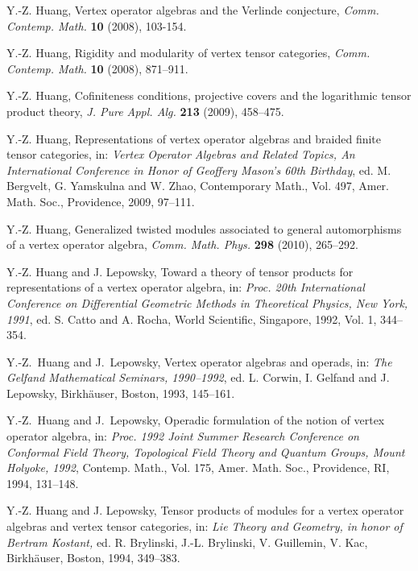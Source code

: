 \documentclass[12pt]{article}
\begin{document}
\begin{thebibliography}{FGST2}
 Y.-Z. Huang, Vertex operator
algebras and the Verlinde conjecture, {\em Comm. Contemp. Math.}
{\bf 10} (2008), 103-154. 

 Y.-Z. Huang, Rigidity and modularity of vertex
tensor categories, {\em Comm. Contemp. Math.} {\bf 10} (2008), 871--911. 


 Y.-Z. Huang, Cofiniteness conditions, projective
covers and the logarithmic tensor product theory, {\em J. Pure
Appl. Alg.} {\bf 213} (2009), 458--475.

Y.-Z. Huang, Representations of vertex operator algebras and braided 
finite tensor categories, in: {\it Vertex Operator Algebras and Related 
Topics, An International Conference in Honor of Geoffery Mason's 60th Birthday}, 
ed. M. Bergvelt, G. Yamskulna and W. Zhao, Contemporary Math., Vol. 497, 
Amer. Math. Soc., Providence, 2009, 97--111. 

Y.-Z. Huang, Generalized twisted modules associated to 
general automorphisms of a vertex operator algebra, 
{\it Comm. Math. Phys.} {\bf 298} (2010), 265--292. 

Y.-Z. Huang and J. Lepowsky, Toward a
theory of tensor products for representations of a vertex operator
algebra, in: {\em Proc. 20th International Conference on Differential
Geometric Methods in Theoretical Physics, New York, 1991},
ed. S. Catto and A. Rocha, World Scientific, Singapore, 1992, Vol. 1,
344--354.

Y.-Z.~Huang and J.~Lepowsky,
Vertex operator algebras and operads,
in: {\em The Gelfand Mathematical Seminars, 1990--1992},
ed. L. Corwin, I. Gelfand and J. Lepowsky, Birkh\"{a}user, Boston,
1993, 145--161.

Y.-Z.~Huang and J.~Lepowsky,
Operadic formulation of the notion of vertex operator algebra,
in: {\em Proc. 1992 Joint Summer Research Conference on Conformal
Field Theory, Topological Field Theory and Quantum Groups, Mount
Holyoke, 1992},
Contemp. Math., Vol. 175, Amer. Math. Soc., Providence, RI, 1994,
131--148.

Y.-Z. Huang and J. Lepowsky, Tensor products of modules for a vertex
operator algebras and vertex tensor categories, in:
     {\em Lie Theory and Geometry,
in honor of Bertram Kostant,}
ed. R. Brylinski, J.-L. Brylinski, V. Guillemin, V. Kac,
Birkh\"{a}user, Boston, 1994, 349--383.


\end{thebibliography}
\end{document}
